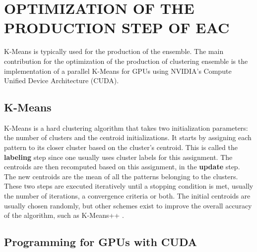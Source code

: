 \section{\uppercase{Optimization of the production step of EAC}}
\label{sec:production}

K-Means is typically used for the production of the ensemble.
The main contribution for the optimization of the production of clustering ensemble is the implementation of a parallel K-Means for GPUs using NVIDIA's Compute Unified Device Architecture (CUDA).


\subsection{K-Means}

K-Means is a hard clustering algorithm that takes two initialization parameters: the number of clusters and the centroid initializations.
It starts by assigning each pattern to its closer cluster based on the cluster's centroid.
This is called the \textbf{labeling} step since one usually uses cluster labels for this assignment.
The centroids are then recomputed based on this assignment, in the \textbf{update} step.
The new centroids are the mean of all the patterns belonging to the clusters. %
These two steps are executed iteratively until a stopping condition is met, usually the number of iterations, a convergence criteria or both.
The initial centroids are usually chosen randomly, but other schemes exist to improve the overall accuracy of the algorithm, such as K-Means++ \cite{Arthur2007}.

\subsection{Programming for GPUs with CUDA}


